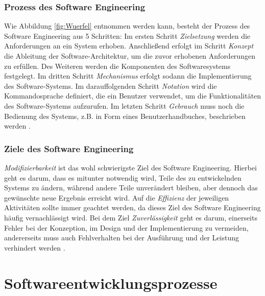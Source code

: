  \subsubsection{Prozess des Software Engineering}

Wie Abbildung  \ref{fig:Wuerfel} entnommen werden kann, besteht der Prozess des Software Engineering aus 5 Schritten: Im ersten Schritt \textit{Zielsetzung} werden die Anforderungen an ein System erhoben. Anschließend erfolgt im Schritt \textit{Konzept} die Ableitung der Software-Architektur, um die zuvor erhobenen Anforderungen zu erfüllen. Des Weiteren werden die Komponenten des Softwaresystems festgelegt. Im dritten Schritt \textit {Mechanismus} erfolgt sodann die Implementierung des Software-Systems. Im darauffolgenden Schritt \textit{Notation} wird die Kommandosprache definiert, die ein Benutzer verwendet, um die Funktionalitäten des Software-Systems aufzurufen. Im letzten Schritt \textit{Gebrauch} muss noch die Bedienung des Systems, z.B. in Form eines Benutzerhandbuches, beschrieben werden \cite{ross1975software}.

  \subsubsection{Ziele des Software Engineering}

\textit{Modifizierbarkeit} ist das wohl schwierigste Ziel des Software Engineering. Hierbei geht es darum, dass es mitunter notwendig wird, Teile des zu entwickelnden Systems zu ändern, während andere Teile unverändert bleiben, aber dennoch das gewünschte neue Ergebnis erreicht wird. Auf die \textit{Effizienz} der jeweiligen Aktivitäten sollte immer geachtet werden, da dieses Ziel des Software Engineering häufig vernachlässigt wird. Bei dem Ziel \textit{Zuverlässigkeit} geht es darum, einerseits Fehler bei der Konzeption, im Design und der Implementierung zu vermeiden, andererseits muss auch Fehlverhalten bei der Ausführung und der Leistung verhindert werden \cite{ross1975software}.
 
\section{Softwareentwicklungsprozesse}\label{sec:chapter.2: Softwareentwicklungsprozesse}

